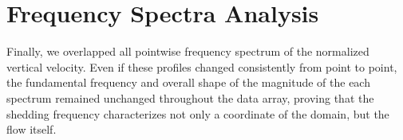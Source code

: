\documentclass[12pt]{article}
\begin{document}
\section{Frequency Spectra Analysis} \label{sec:spectra}

        Finally, we overlapped all pointwise frequency spectrum of the normalized vertical velocity. Even if these profiles changed consistently from point to point, the fundamental frequency and overall shape of the magnitude of the each spectrum remained unchanged throughout the data array, proving that the shedding frequency characterizes not only a coordinate of the domain, but the flow itself.

\newpage



\end{document}
